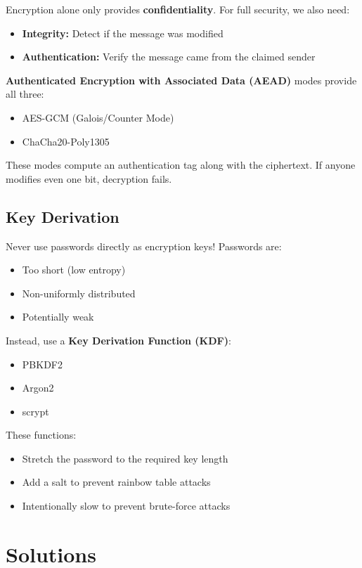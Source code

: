 \documentclass[11pt,a4paper]{report}
\begin{document}
Encryption alone only provides \textbf{confidentiality}. For full security, we also need:
\begin{itemize}
\item \textbf{Integrity:} Detect if the message was modified
\item \textbf{Authentication:} Verify the message came from the claimed sender
\end{itemize}

\textbf{Authenticated Encryption with Associated Data (AEAD)} modes provide all three:
\begin{itemize}
\item AES-GCM (Galois/Counter Mode)
\item ChaCha20-Poly1305
\end{itemize}

These modes compute an authentication tag along with the ciphertext. If anyone modifies even one bit, decryption fails.

\subsection{Key Derivation}

Never use passwords directly as encryption keys! Passwords are:
\begin{itemize}
\item Too short (low entropy)
\item Non-uniformly distributed
\item Potentially weak
\end{itemize}

Instead, use a \textbf{Key Derivation Function (KDF)}:
\begin{itemize}
\item PBKDF2
\item Argon2
\item scrypt
\end{itemize}

These functions:
\begin{itemize}
\item Stretch the password to the required key length
\item Add a salt to prevent rainbow table attacks
\item Intentionally slow to prevent brute-force attacks
\end{itemize}


\newpage
\section{Solutions}
\printcursols
\newpage
\end{document}
